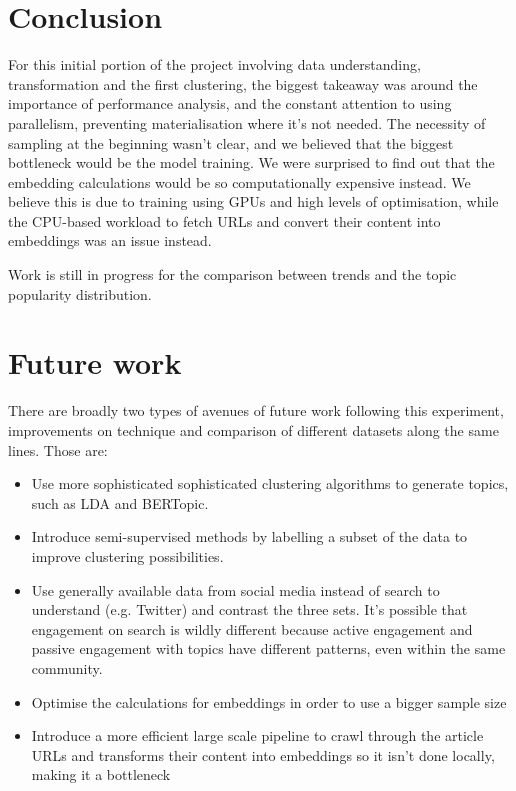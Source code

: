 \documentclass[nonacm,sigconf]{acmart}
\begin{document}
\section{Conclusion}

For this initial portion of the project involving data understanding, transformation and the first clustering, the biggest takeaway was around the importance of performance analysis, and the constant attention to using parallelism, preventing materialisation where it's not needed. The necessity of sampling at the beginning wasn't clear, and we believed that the biggest bottleneck would be the model training. We were surprised to find out that the embedding calculations would be so computationally expensive instead. We believe this is due to training using GPUs and high levels of optimisation, while the CPU-based workload to fetch URLs and convert their content into embeddings was an issue instead.

Work is still in progress for the comparison between trends and the topic popularity distribution.

\section{Future work}

There are broadly two types of avenues of future work following this experiment, improvements on technique and comparison of different datasets along the same lines. Those are:

\begin{itemize}
    \item Use more sophisticated sophisticated clustering algorithms to generate topics, such as LDA and BERTopic.
    \item Introduce semi-supervised methods by labelling a subset of the data to improve clustering possibilities.
    \item Use generally available data from social media instead of search to understand (e.g. Twitter) and contrast the three sets. It's possible that engagement on search is wildly different because active engagement and passive engagement with topics have different patterns, even within the same community.
    \item Optimise the calculations for embeddings in order to use a bigger sample size
    \item Introduce a more efficient large scale pipeline to crawl through the article URLs and transforms their content into embeddings so it isn't done locally, making it a bottleneck
\end{itemize}
\end{document}
